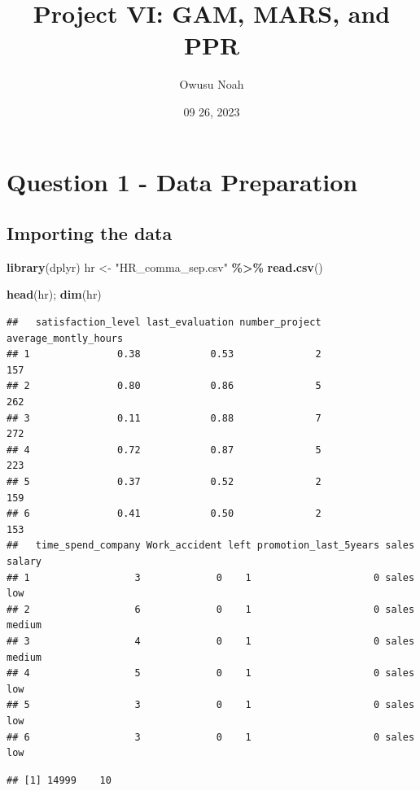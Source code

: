 \documentclass[
  11pt,
]{article}
\title{Project VI: GAM, MARS, and PPR}
\author{Owusu Noah}
\date{09 26, 2023}
\newenvironment{Shaded}{\begin{snugshade}}{\end{snugshade}}
\newcommand{\FunctionTok}[1]{\textcolor[rgb]{0.13,0.29,0.53}{\textbf{#1}}}
\newcommand{\NormalTok}[1]{#1}
\newcommand{\OtherTok}[1]{\textcolor[rgb]{0.56,0.35,0.01}{#1}}
\newcommand{\SpecialCharTok}[1]{\textcolor[rgb]{0.81,0.36,0.00}{\textbf{#1}}}
\newcommand{\StringTok}[1]{\textcolor[rgb]{0.31,0.60,0.02}{#1}}
\begin{document}
\maketitle

{
\setcounter{tocdepth}{4}
\tableofcontents
}
\newpage
\section{Question 1 - Data Preparation}

\subsection{Importing the data}

\begin{Shaded}
\begin{Highlighting}[]
\FunctionTok{library}\NormalTok{(dplyr)}
\NormalTok{hr }\OtherTok{\textless{}{-}} \StringTok{"HR\_comma\_sep.csv"} \SpecialCharTok{\%\textgreater{}\%} 
  \FunctionTok{read.csv}\NormalTok{()}

\FunctionTok{head}\NormalTok{(hr); }\FunctionTok{dim}\NormalTok{(hr)}
\end{Highlighting}
\end{Shaded}

\begin{verbatim}
##   satisfaction_level last_evaluation number_project average_montly_hours
## 1               0.38            0.53              2                  157
## 2               0.80            0.86              5                  262
## 3               0.11            0.88              7                  272
## 4               0.72            0.87              5                  223
## 5               0.37            0.52              2                  159
## 6               0.41            0.50              2                  153
##   time_spend_company Work_accident left promotion_last_5years sales salary
## 1                  3             0    1                     0 sales    low
## 2                  6             0    1                     0 sales medium
## 3                  4             0    1                     0 sales medium
## 4                  5             0    1                     0 sales    low
## 5                  3             0    1                     0 sales    low
## 6                  3             0    1                     0 sales    low
\end{verbatim}

\begin{verbatim}
## [1] 14999    10
\end{verbatim}
\end{document}

